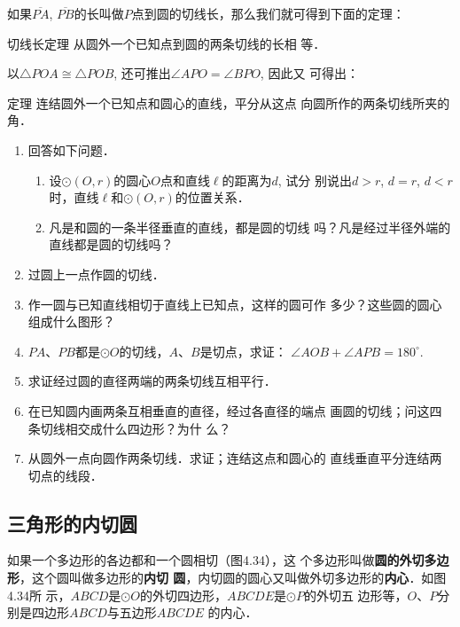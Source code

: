 如果$\overline{PA}$, $\overline{PB}$的长叫做$P$点到圆的切线长，那么我们就可得到下面的定理：

\begin{blk}
    {切线长定理}
从圆外一个已知点到圆的两条切线的长相
等．
\end{blk}

以$\triangle POA\cong \triangle POB$, 还可推出$\angle APO=\angle BPO$, 因此又
可得出：

\begin{blk}
    {定理} 连结圆外一个已知点和圆心的直线，平分从这点
向圆所作的两条切线所夹的角．
\end{blk}

\begin{ex}
\begin{enumerate}
    \item 回答如下问题．
\begin{enumerate}
    \item 设$\odot (O,r)$的圆心$O$点和直线$\ell$的距离为$d$, 试分
    别说出$d>r$, $d=r$, $d<r$时，直线$\ell$和$\odot (O,r)$的位置关系．
    \item 凡是和圆的一条半径垂直的直线，都是圆的切线
    吗？凡是经过半径外端的直线都是圆的切线吗？
\end{enumerate}
    \item 过圆上一点作圆的切线．
    \item 作一圆与已知直线相切于直线上已知点，这样的圆可作
    多少？这些圆的圆心组成什么图形？
    \item $PA$、$PB$都是$\odot O$的切线，$A$、$B$是切点，求证：
    $\angle AOB+\angle APB=180^{\circ}$.
    \item 求证经过圆的直径两端的两条切线互相平行．
    \item 在已知圆内画两条互相垂直的直径，经过各直径的端点
    画圆的切线；问这四条切线相交成什么四边形？为什
    么？
    \item 从圆外一点向圆作两条切线．求证；连结这点和圆心的
    直线垂直平分连结两切点的线段．
\end{enumerate}
\end{ex}

\subsection{三角形的内切圆}
如果一个多边形的各边都和一个圆相切（图4.34），这
个多边形叫做\textbf{圆的外切多边形}，这个圆叫做多边形的\textbf{内切
圆}，内切圆的圆心又叫做外切多边形的\textbf{内心}．如图4.34所
示，$ABCD$是$\odot O$的外切四边形，$ABCDE$是$\odot P$的外切五
边形等，$O$、$P$分别是四边形$ABCD$与五边形$ABCDE$
的内心．

